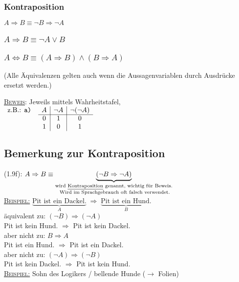 \documentclass[10pt,a4paper,titlepage,fleqn]{article}
\begin{document}
\subsubsection{Kontraposition} $A\Rightarrow B \equiv \neg B \Rightarrow \neg A$
\subsubsection{$A\Rightarrow B \equiv \neg A \vee B$ }
\subsubsection{$A\Leftrightarrow B \equiv (A \Rightarrow B)\wedge (B\Rightarrow A)$ }
	\hfill\break
	(Alle Äquivalenzen gelten auch wenn die Aussagenvariablen durch 
	Ausdrücke ersetzt werden.)\\
	\textsc{\underline{Beweis}}: \;Jeweils mittels Wahrheitstafel,\vspace{0.5em}\\
	$\begin{array}{lc|c|c}
		\text{z.B.: }\texttt{a) } & A & \neg A&\neg(\neg A)\\
		\cline{2-4}
									&0&1&0\\
									&1&0&1
	
	\end{array}$
\subsection{Bemerkung zur Kontraposition}
	(1.9f): $A\Rightarrow B \equiv \underbrace{(\neg B \Rightarrow \neg A)}_{\substack{
	\text{wird \underline{Kontraposition} genannt, wichtig für Beweis.}\\
	\text{ Wird im Sprachgebrauch oft falsch verwendet.}}}$\vspace{0.5em}\\
	\underline{\textsc{Beispiel:}} \; $\underbrace{\text{Pit ist ein Dackel.}}_{A}
	 \;\Rightarrow\; \underbrace{\text{Pit ist ein Hund.}}_{B}$\\
	äquivalent zu: $(\neg B)\Rightarrow (\neg A)$\\
	 Pit ist kein Hund. $\Rightarrow$
	Pit ist kein Dackel.\\
	aber nicht zu: $B\Rightarrow A$\\
	 Pit ist ein Hund. $\Rightarrow$
	Pit ist ein Dackel.\\
	\nopagebreak aber nicht zu: $(\neg A)\Rightarrow (\neg B)$\\
	 Pit ist kein Dackel. $\Rightarrow$
	Pit ist kein Hund.\\
	\underline{\textsc{Beispiel:}} \; Sohn des Logikers / bellende Hunde 
	($\rightarrow$ Folien)
\end{document}
